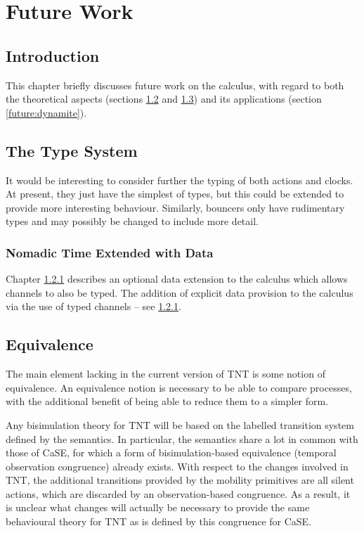 \chapter{Future Work}
\label{futurework}

\section{Introduction}

This chapter briefly discusses future work on the calculus, with regard
to both the theoretical aspects (sections \ref{future:types} and
\ref{future:equiv}) and its applications (section \ref{future:dynamite}).

\section{The Type System}
\label{future:types}

It would be interesting to consider further the
typing of both actions and clocks.  At present, they just have the
simplest of types, but this could be extended to provide more
interesting behaviour.  Similarly, bouncers only have rudimentary types
and may possibly be changed to include more detail.

\subsection{Nomadic Time Extended with Data}
\label{tnted}
Chapter \ref{tnted} describes an optional data extension to the
calculus which allows channels to also be typed.
The addition of explicit data provision to the calculus via the
  use of typed channels -- see \ref{tnted}.

\section{Equivalence}
\label{future:equiv}

The main element lacking in the current version of TNT is some notion of
equivalence.  An equivalence notion is necessary to be able to compare
processes, with the additional benefit of being able to reduce them to a
simpler form.

Any bisimulation theory for TNT will be based on the labelled transition
system defined by the semantics.  In particular, the semantics share a
lot in common with those of CaSE, for which a form of bisimulation-based
equivalence (temporal observation congruence) already exists.  With
respect to the changes involved in TNT, the additional transitions
provided by the mobility primitives are all silent actions, which are
discarded by an observation-based congruence.  As a result, it is
unclear what changes will actually be necessary to provide the same
behavioural theory for TNT as is defined by this congruence for CaSE.

